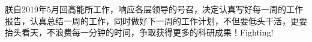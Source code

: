 \begin{overview}
\thispagestyle{empty}
朕自2019年5月回高能所工作，响应各层领导的号召，决定认真写好每一周的工作报告，认真总结一周的工作，同时做好下一周的工作计划，不但要低头干活，更要抬头看天，不浪费每一分钟的时间，争取获得更多的科研成果！Fighting!

\end{overview}
